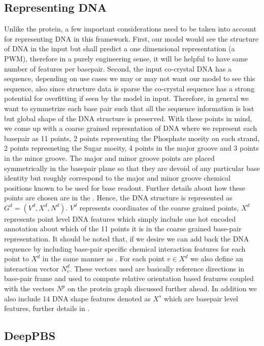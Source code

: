 \subsection{Representing DNA}
Unlike the protein, a few important considerations need to be taken into account for representing
DNA in this framework. First, our model would see the structure of DNA in the input but shall predict a one
dimensional representation (a PWM), therefore in a purely engineering sense, it will be helpful to
have same number of features per basepair. Second, the input co-crystal DNA has a sequence, depending on
use cases we may or may not want our model to see this sequence, also since structure data is sparse
the  co-crystal sequence has a strong potential for overfitting if seen by the model in input.
Therefore, in general we want to symmetrize each base pair such that all the sequence information is
lost but global shape of the DNA structure is preserved.
With these points in mind, we come up with a coarse grained represntation of DNA
where we represent each basepair as 11 points, 2 points representing the Phosphate moeity on each
strand, 2 points represneting the Sugar moeity, 4 points in the major groove and 3 points in the minor
groove. The major and minor groove points are placed symmetrically in the basepair plane so that
they are devoid of any particular base identity but roughly correspond to the major and minor
groove chemical positions known  to be used for base readout. Further
details about how these points are chosen are in the . Hence, the DNA structure is represented as $G^d = (V^d, X^d, N^d)$. $V^d$ represents
coordinates of the coarse grained points, $X^d$ represents point level DNA features which simply
include one hot encoded annotation about which of the 11 points it is in the coarse grained
base-pair representation. It should be noted that, if we desire we can add back the DNA sequence by
including base-pair specific chemical interaction features for each point to $X^d$ in the same manner as . For each point $v \in X^d$ we also define an interaction vector $N^d_v$. These
vectors used are basically reference directions in base-pair frame and used to compute relative
orientation based features coupled with the vectors $N^p$ on the protein graph discussed further
ahead. In addition we also include 14 DNA shape features denoted as $X^s$ which are basepair level features, further
details in .
\subsection{DeepPBS}

